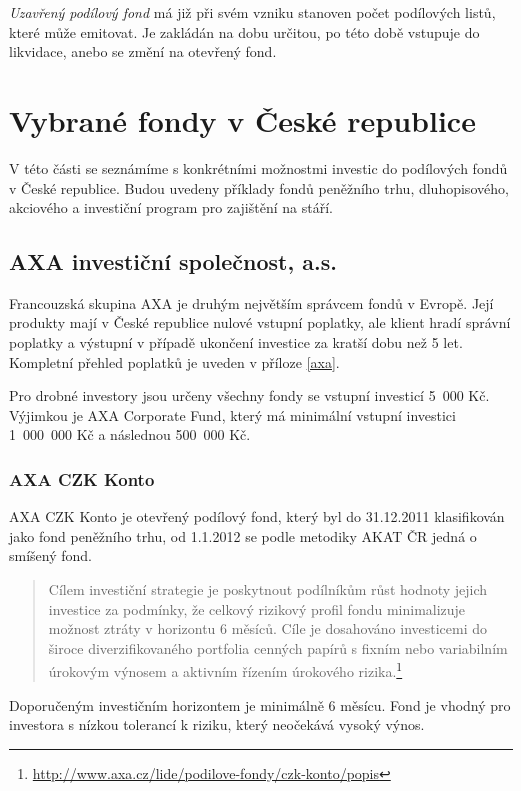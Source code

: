 \documentclass[a4paper,12pt]{article}
\begin{document}
\emph{Uzavřený podílový fond} má již při svém vzniku stanoven počet podílových listů, které může emitovat. Je zakládán na dobu určitou, po této době vstupuje do likvidace, anebo se změní na otevřený fond.

\section{Vybrané fondy v České republice}
	V této části se seznámíme s konkrétními možnostmi investic do podílových fondů v České republice. Budou uvedeny příklady fondů peněžního trhu, dluhopisového, akciového a investiční program pro zajištění na stáří.
	\subsection{AXA investiční společnost, a.s.}
		Francouzská skupina AXA je druhým největším správcem fondů v Evropě.\cite{axa_about} Její produkty mají v České republice nulové vstupní poplatky, ale klient hradí správní poplatky a výstupní v případě ukončení investice za kratší dobu než 5 let. Kompletní přehled poplatků je uveden v příloze \ref{axa}.
		
		Pro drobné investory jsou určeny všechny fondy se vstupní investicí 5~000 Kč. Výjimkou je AXA Corporate Fund, který má minimální vstupní investici 1~000~000 Kč a následnou 500~000 Kč.
		
		\subsubsection{AXA CZK Konto}
			AXA CZK Konto je otevřený podílový fond, který byl do 31.12.2011 klasifikován jako fond peněžního trhu, od 1.1.2012 se podle metodiky AKAT ČR jedná o smíšený fond.
			\begin{quote}
				Cílem investiční strategie je poskytnout podílníkům růst hodnoty jejich investice za podmínky, že celkový rizikový profil fondu minimalizuje možnost ztráty v horizontu 6 měsíců. Cíle je dosahováno investicemi do široce diverzifikovaného portfolia cenných papírů s fixním nebo variabilním úrokovým výnosem a aktivním řízením úrokového rizika.\footnote{\url{http://www.axa.cz/lide/podilove-fondy/czk-konto/popis}}
			\end{quote}
			
			Doporučeným investičním horizontem je minimálně 6 měsícu. Fond je vhodný pro investora s nízkou tolerancí k riziku, který neočekává vysoký výnos.
			
\end{document}
